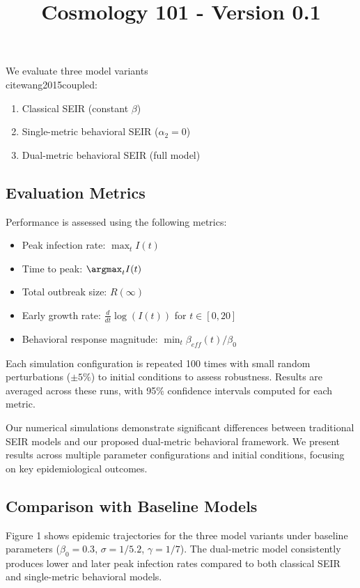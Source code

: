 \documentclass{article}\usepackage{graphicx} \usepackage{amsmath} \usepackage{colortbl}\title{Cosmology 101 - Version 0.1}
\begin{document}
We evaluate three model variants \\cite{wang2015coupled}:

\begin{enumerate}
    \item Classical SEIR (constant $\beta$)
    \item Single-metric behavioral SEIR ($\alpha_2 = 0$)
    \item Dual-metric behavioral SEIR (full model)
\end{enumerate}

\subsection{Evaluation Metrics}

Performance is assessed using the following metrics:

\begin{itemize}
    \item Peak infection rate: $\max_{t} I(t)$
    \item Time to peak: $\argmax_{t} I(t)$
    \item Total outbreak size: $R(\infty)$
    \item Early growth rate: $\frac{d}{dt}\log(I(t))$ for $t \in [0,20]$
    \item Behavioral response magnitude: $\min_{t} \beta_{eff}(t)/\beta_0$
\end{itemize}

Each simulation configuration is repeated 100 times with small random perturbations ($\pm 5\%$) to initial conditions to assess robustness. Results are averaged across these runs, with 95\% confidence intervals computed for each metric.

Our numerical simulations demonstrate significant differences between traditional SEIR models and our proposed dual-metric behavioral framework. We present results across multiple parameter configurations and initial conditions, focusing on key epidemiological outcomes.

\subsection{Comparison with Baseline Models}

Figure 1 shows epidemic trajectories for the three model variants under baseline parameters ($\beta_0 = 0.3$, $\sigma = 1/5.2$, $\gamma = 1/7$). The dual-metric model consistently produces lower and later peak infection rates compared to both classical SEIR and single-metric behavioral models.
\end{document}
